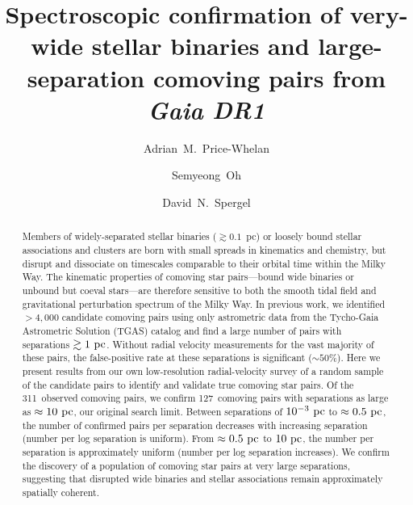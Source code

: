 \documentclass[modern, letterpaper]{aastex61}
\newcommand{\npairsobs}{311}
\newcommand{\ncomoving}{127}
\begin{document}
\sloppy\sloppypar\raggedbottom\frenchspacing %

\title{Spectroscopic confirmation of very-wide stellar binaries and
       large-separation comoving pairs from \textsl{Gaia DR1}}

\author[0000-0003-0872-7098]{Adrian~M.~Price-Whelan}

\author[0000-0001-7790-5308]{Semyeong~Oh}

\author[0000-0002-5151-0006]{David~N.~Spergel}




\begin{abstract}
Members of widely-separated stellar binaries ($\gtrsim 0.1$~pc) or loosely bound
stellar associations and clusters are born with small spreads in kinematics and
chemistry, but disrupt and dissociate on timescales comparable to their orbital
time within the Milky Way.
The kinematic properties of comoving star pairs---bound wide binaries or unbound
but coeval stars---are therefore sensitive to both the smooth tidal field and
gravitational perturbation spectrum of the Milky Way.
In previous work, we identified $>4,000$ candidate comoving pairs using only
astrometric data from the Tycho-Gaia Astrometric Solution (TGAS) catalog and
find a large number of pairs with separations $\gtrsim 1~\mathrm{pc}$.
Without radial velocity measurements for the vast majority of these pairs, the
false-positive rate at these separations is significant ($\sim 50\%$).
Here we present results from our own low-resolution radial-velocity survey of a
random sample of the candidate pairs to identify and validate true comoving star
pairs.
Of the \npairsobs\ observed comoving pairs, we confirm \ncomoving\ comoving
pairs with separations as large as $\approx 10~\mathrm{pc}$, our original search limit.
Between separations of $10^{-3}~\mathrm{pc}$ to $\approx 0.5~\mathrm{pc}$,
the number of confirmed pairs per separation decreases with increasing
separation (number per log separation is uniform).
From $\approx 0.5~\mathrm{pc}$ to $10~\mathrm{pc}$, the number per separation is approximately
uniform (number per log separation increases).
We confirm the discovery of a population of comoving star pairs at very large
separations, suggesting that disrupted wide binaries and stellar associations
remain approximately spatially coherent.
\end{abstract}
\end{document}
